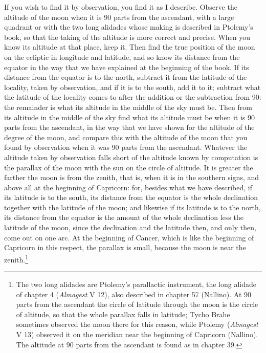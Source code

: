 \documentclass[11pt]{article}
\newcommand{\ArPage}[1]{\marginpar{\footnotesize\color{gray}Ar.\,p.\,#1}}
\begin{document}
\par \ArPage{128}If you wish to find it by observation, you find it as I describe. Observe the altitude of the moon when it is 90 parts from the ascendant, with a large quadrant or with the two long alidades whose making is described in Ptolemy's book, so that the taking of the altitude is more correct and precise. When you know its altitude at that place, keep it. Then find the true position of the moon on the ecliptic in longitude and latitude, and so know its distance from the equator in the way that we have explained at the beginning of the book. If its distance from the equator is to the north, subtract it from the latitude of the locality, taken by observation, and if it is to the south, add it to it; subtract what the latitude of the locality comes to after the addition or the subtraction from 90: the remainder is what its altitude in the middle of the sky must be. Then from its altitude in the middle of the sky find what its altitude must be when it is 90 parts from the ascendant, in the way that we have shown for the altitude of the degree of the moon, and compare this with the altitude of the moon that you found by observation when it was 90 parts from the ascendant. Whatever the altitude taken by observation falls short of the altitude known by computation is the parallax of the moon with the sun on the circle of altitude. It is greater the farther the moon is from the zenith, that is, when it is in the southern signs, and above all at the beginning of Capricorn: for, besides what we have described, if its latitude is to the south, its distance from the equator is the whole declination together with the latitude of the moon; and likewise if its latitude is to the north, its distance from the equator is the amount of the whole declination less the latitude of the moon, since the declination and the latitude then, and only then, come out on one arc. At the beginning of Cancer, which is like the beginning of Capricorn in this respect, the parallax is small, because the moon is near the zenith.\footnote{The two long alidades are Ptolemy's parallactic instrument, the long alidade of chapter 4 (\emph{Almagest} V 12), also described in chapter 57 (Nallino). At 90 parts from the ascendant the circle of latitude through the moon is the circle of altitude, so that the whole parallax falls in latitude; Tycho Brahe sometimes observed the moon there for this reason, while Ptolemy (\emph{Almagest} V 13) observed it on the meridian near the beginning of Capricorn (Nallino). The altitude at 90 parts from the ascendant is found as in chapter 39.}\par
\end{document}
